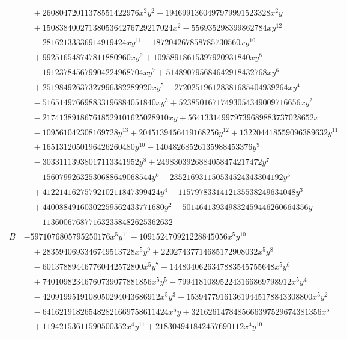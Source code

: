 \documentclass[11pt]{article}
\begin{document}
\begin{longtable}{@{}ll@{}}
 & $\quad +26080472011378551422976x^{2}y^{2}+1946991360497979991523328x^{2}y$\\
 & $\quad +1508384002713805364276729217024x^{2}-556935298399862784xy^{12}$\\
 & $\quad -28162133336914919424xy^{11}-187204267858785730560xy^{10}$\\
 & $\quad +992516548747811880960xy^{9}+10958918615397920931840xy^{8}$\\
 & $\quad -191237845679904224968704xy^{7}+514890795684642918432768xy^{6}$\\
 & $\quad +25198492637327996382289920xy^{5}-272025196128381685404939264xy^{4}$\\
 & $\quad -516514976698833196884051840xy^{3}+52385016717493054349009716656xy^{2}$\\
 & $\quad -217413891867618529101625028910xy+564133149979739689883737028652x$\\
 & $\quad -109561042308169728y^{13}+2045139456419168256y^{12}+132204418559096389632y^{11}$\\
 & $\quad +1651312050196426260480y^{10}-14048268526135988453376y^{9}$\\
 & $\quad -30331113938017113341952y^{8}+2498303926884058474217472y^{7}$\\
 & $\quad -15607992632530688649068544y^{6}-235216931150534524343304192y^{5}$\\
 & $\quad +4122141627579210211847399424y^{4}-1157978331412135538249634048y^{3}$\\
 & $\quad +44008849160302259562433771680y^{2}-501464139349832459446260664356y$\\
 & $\quad -1136006768771632358482625362632$\\
$B$ & $-5971076805795250176x^{5}y^{11}-109152470921228845056x^{5}y^{10}$\\
 & $\quad +2835940693346749513728x^{5}y^{9}+22027437714685172908032x^{5}y^{8}$\\
 & $\quad -601378894467760442572800x^{5}y^{7}+1448040626347883545755648x^{5}y^{6}$\\
 & $\quad +74010982346760739077881856x^{5}y^{5}-799418108952243166869798912x^{5}y^{4}$\\
 & $\quad -4209199519108050294043686912x^{5}y^{3}+153947791613619445178843308800x^{5}y^{2}$\\
 & $\quad -641621918265482821669758611424x^{5}y+3216261478485666397529674381356x^{5}$\\
 & $\quad +11942153611590500352x^{4}y^{11}+218304941842457690112x^{4}y^{10}$\\

\end{longtable}
\end{document}
